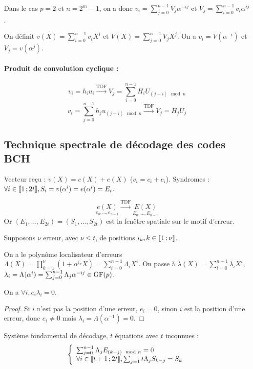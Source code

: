 	Dans le cas $p = 2$ et $n = 2^m - 1$, on a donc $v_i = \sum_{j = 0}^{n - 1} V_j \alpha^{-ij}$ et $V_j = \sum_{i = 0}^{n - 1} v_i \alpha^{ij}$.

	On définit $v(X) = \sum_{i = 0}^{n - 1} v_i X^i$ et $V(X) = \sum_{j = 0}^{n - 1} V_j X^j$.
	On a $v_i = V(\alpha^{-i})$ et $V_j = v(\alpha^j)$.

	\paragraph{Produit de convolution cyclique :}
	$$v_i = h_i u_i \overset{\text{TDF}}{\longrightarrow} V_j = \sum_{i = 0}^{n - 1} H_i U_{(j - i) \mod{n}}$$
	$$v_i = \sum_{j = 0}^{n - 1} h_j u_{(j - i) \mod{n}} \overset{\text{TDF}}{\longrightarrow} V_j = H_j U_j$$


\subsection{Technique spectrale de décodage des codes BCH}

	Vecteur reçu : $v(X) = c(X) + e(X)$ ($v_i = c_i + e_i$).
	Syndromes : $\forall i \in \mathopen{}\mathclose{\left[\![1\mathclose{}\mathpunct{};2t\right]\!]}, S_i = v(\alpha^i) = e(\alpha^i) = E_i$.

	$$\underset{e_0,\ldots,e_{n - 1}}{e(X)} \overset{\text{TDF}}{\longrightarrow} \underset{E_0,\ldots,E_{n - 1}}{E(X)}$$
	Or $(E_1,\ldots,E_{2t}) = (S_1,\ldots,S_{2t})$ est la fenêtre spatiale sur le motif d'erreur.

	Supposons $\nu$ erreur, avec $\nu \leq t$, de positions $i_k, k \in \mathopen{}\mathclose{\left[\![1\mathclose{}\mathpunct{};\nu\right]\!]}$.

	On a le polynôme localisateur d'erreurs $\Lambda(X) = \prod_{k = 1}^{\nu} (1 + \alpha^{i_k} X) = \sum_{i = 0}^{n - 1} \Lambda_i X^i$.
	On passe à $\lambda(X) = \sum_{i = 0}^{n - 1} \lambda_i X^i$, $\lambda_i = \Lambda(\alpha^i) = \sum_{j = 0}^{n - 1} \Lambda_j \alpha^{-ij} \in \mathrm{GF}(p)$.

	\begin{pop}
		On a $\forall i, e_i \lambda_i = 0$.
	\end{pop}

	\begin{proof}
		Si $i$ n'est pas la position d'une erreur, $e_i = 0$, sinon $i$ est la position d'une erreur, donc $e_i \neq 0$ mais $\lambda_i = \Lambda(\alpha^{-1}) = 0$.
	\end{proof}

	Système fondamental de décodage, $t$ équations avec $t$ inconnues :
	$$\left\{ \begin{array}{l}
		\sum_{j = 0}^{n - 1} \Lambda_j E_{(k - j) \mod{n}} = 0 \\
		\forall i \in \mathopen{}\mathclose{\left[\![t + 1\mathclose{}\mathpunct{};2t\right]\!]}, \sum_{j = 1}{t} \Lambda_j S_{k - j} = S_k
		\end{array} \right.$$


